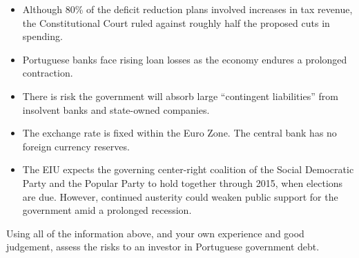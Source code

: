 \documentclass[letterpaper,12pt]{exam}
\begin{document}
\begin{questions}
\begin{itemize}
\item Although 80\% of the deficit reduction plans involved increases in
tax revenue, the Constitutional Court ruled against roughly half the proposed
cuts in spending.

\item Portuguese banks face rising loan losses as the economy endures a prolonged
contraction.

\item There is risk the government will absorb large
``contingent liabilities'' from insolvent banks and state-owned companies.

\item The exchange rate is fixed within the Euro Zone.
The central bank has no foreign currency reserves.

\item The EIU expects the governing center-right coalition
of the Social Democratic Party and the Popular Party
to hold together through 2015, when elections are due.
However, continued austerity could weaken public support for the government
amid a prolonged recession.
\end{itemize}

Using all of the information above, and your own experience and good judgement,
assess the risks to an investor in Portuguese government debt.
%

\begin{solution}
\begin{parts}

\end{parts}
\end{solution}
\end{questions}
\end{document}

